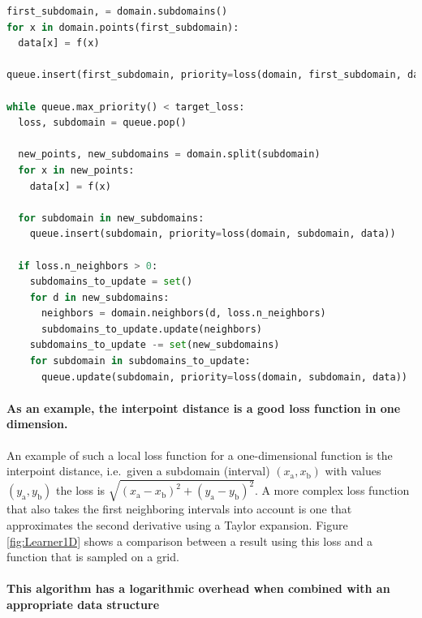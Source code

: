 \documentclass[english, twocolumn, 10pt, aps, superscriptaddress, floatfix, prb, citeautoscript]{revtex4-1}
\begin{document}
\begin{lstlisting}[language=Python]
first_subdomain, = domain.subdomains()
for x in domain.points(first_subdomain):
  data[x] = f(x)

queue.insert(first_subdomain, priority=loss(domain, first_subdomain, data))

while queue.max_priority() < target_loss:
  loss, subdomain = queue.pop()

  new_points, new_subdomains = domain.split(subdomain)
  for x in new_points:
    data[x] = f(x)

  for subdomain in new_subdomains:
    queue.insert(subdomain, priority=loss(domain, subdomain, data))

  if loss.n_neighbors > 0:
    subdomains_to_update = set()
    for d in new_subdomains:
      neighbors = domain.neighbors(d, loss.n_neighbors)
      subdomains_to_update.update(neighbors)
    subdomains_to_update -= set(new_subdomains)
    for subdomain in subdomains_to_update:
      queue.update(subdomain, priority=loss(domain, subdomain, data))
\end{lstlisting}

\paragraph{As an example, the interpoint distance is a good loss function in one dimension.}

An example of such a local loss function for a one-dimensional function is the interpoint distance, i.e.~given a subdomain (interval) \((x_\textrm{a}, x_\textrm{b})\) with values \((y_\textrm{a}, y_\textrm{b})\) the loss is \(\sqrt{(x_\textrm{a} - x_\textrm{b})^2 + (y_\textrm{a} - y_\textrm{b})^2}\).
A more complex loss function that also takes the first neighboring intervals into account is one that approximates the second derivative using a Taylor expansion.
Figure \ref{fig:Learner1D} shows a comparison between a result using this loss and a function that is sampled on a grid.

\paragraph{This algorithm has a logarithmic overhead when combined with an appropriate data structure}
\end{document}
